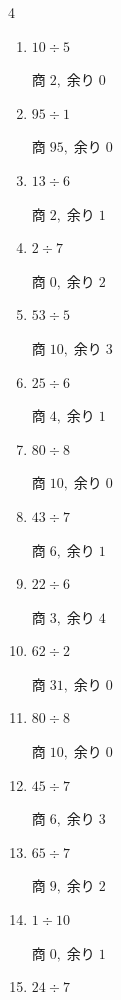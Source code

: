 \begin{multicols}{4}
\begin{enumerate}
        $商\; 18,\; 余り\; 0$

  \item $10 \div 5$

        $商\; 2,\; 余り\; 0$

  \item $95 \div 1$

        $商\; 95,\; 余り\; 0$

  \item $13 \div 6$

        $商\; 2,\; 余り\; 1$

  \item $2 \div 7$

        $商\; 0,\; 余り\; 2$

  \item $53 \div 5$

        $商\; 10,\; 余り\; 3$

  \item $25 \div 6$

        $商\; 4,\; 余り\; 1$

  \item $80 \div 8$

        $商\; 10,\; 余り\; 0$

  \item $43 \div 7$

        $商\; 6,\; 余り\; 1$

  \item $22 \div 6$

        $商\; 3,\; 余り\; 4$

  \item $62 \div 2$

        $商\; 31,\; 余り\; 0$

  \item $80 \div 8$

        $商\; 10,\; 余り\; 0$

  \item $45 \div 7$

        $商\; 6,\; 余り\; 3$

\columnbreak %

  \item $65 \div 7$

        $商\; 9,\; 余り\; 2$

  \item $1 \div 10$

        $商\; 0,\; 余り\; 1$

  \item $24 \div 7$


\end{enumerate}
\end{multicols}
